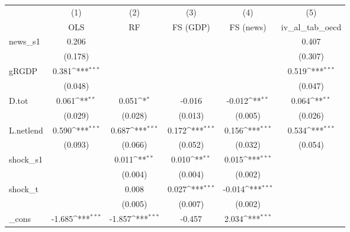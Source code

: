 {
\def\sym#1{\ifmmode^{#1}\else\(^{#1}\)\fi}
\begin{tabular}{l*{5}{c}}
\toprule
            &\multicolumn{1}{c}{(1)}&\multicolumn{1}{c}{(2)}&\multicolumn{1}{c}{(3)}&\multicolumn{1}{c}{(4)}&\multicolumn{1}{c}{(5)}\\
            &\multicolumn{1}{c}{OLS}&\multicolumn{1}{c}{RF}&\multicolumn{1}{c}{FS (GDP)}&\multicolumn{1}{c}{FS (news)}&\multicolumn{1}{c}{iv\_al\_tab\_oecd}\\
\midrule
news\_s1     &       0.206         &                     &                     &                     &       0.407         \\
            &     (0.178)         &                     &                     &                     &     (0.307)         \\
\addlinespace
gRGDP       &       0.381\sym{***}&                     &                     &                     &       0.519\sym{***}\\
            &     (0.048)         &                     &                     &                     &     (0.047)         \\
\addlinespace
D.tot       &       0.061\sym{**} &       0.051\sym{*}  &      -0.016         &      -0.012\sym{**} &       0.064\sym{**} \\
            &     (0.029)         &     (0.028)         &     (0.013)         &     (0.005)         &     (0.026)         \\
\addlinespace
L.netlend   &       0.590\sym{***}&       0.687\sym{***}&       0.172\sym{***}&       0.156\sym{***}&       0.534\sym{***}\\
            &     (0.093)         &     (0.066)         &     (0.052)         &     (0.032)         &     (0.054)         \\
\addlinespace
shock\_s1    &                     &       0.011\sym{**} &       0.010\sym{**} &       0.015\sym{***}&                     \\
            &                     &     (0.004)         &     (0.004)         &     (0.002)         &                     \\
\addlinespace
shock\_t     &                     &       0.008         &       0.027\sym{***}&      -0.014\sym{***}&                     \\
            &                     &     (0.005)         &     (0.007)         &     (0.002)         &                     \\
\addlinespace
\_cons      &      -1.685\sym{***}&      -1.857\sym{***}&      -0.457         &       2.034\sym{***}&                     \\

\end{tabular}}
